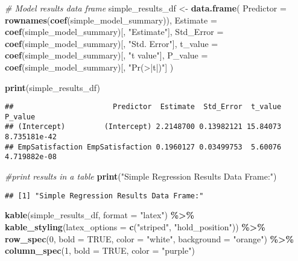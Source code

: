 \documentclass[
]{article}
\newenvironment{Shaded}{\begin{snugshade}}{\end{snugshade}}
\newcommand{\AttributeTok}[1]{\textcolor[rgb]{0.13,0.29,0.53}{#1}}
\newcommand{\CommentTok}[1]{\textcolor[rgb]{0.56,0.35,0.01}{\textit{#1}}}
\newcommand{\ConstantTok}[1]{\textcolor[rgb]{0.56,0.35,0.01}{#1}}
\newcommand{\DecValTok}[1]{\textcolor[rgb]{0.00,0.00,0.81}{#1}}
\newcommand{\FunctionTok}[1]{\textcolor[rgb]{0.13,0.29,0.53}{\textbf{#1}}}
\newcommand{\NormalTok}[1]{#1}
\newcommand{\OtherTok}[1]{\textcolor[rgb]{0.56,0.35,0.01}{#1}}
\newcommand{\SpecialCharTok}[1]{\textcolor[rgb]{0.81,0.36,0.00}{\textbf{#1}}}
\newcommand{\StringTok}[1]{\textcolor[rgb]{0.31,0.60,0.02}{#1}}
\begin{document}
\begin{Shaded}
\begin{Highlighting}[]
\CommentTok{\# Model results data frame}
\NormalTok{simple\_results\_df }\OtherTok{\textless{}{-}} \FunctionTok{data.frame}\NormalTok{(}
  \AttributeTok{Predictor =} \FunctionTok{rownames}\NormalTok{(}\FunctionTok{coef}\NormalTok{(simple\_model\_summary)),}
  \AttributeTok{Estimate =} \FunctionTok{coef}\NormalTok{(simple\_model\_summary)[, }\StringTok{"Estimate"}\NormalTok{],}
  \AttributeTok{Std\_Error =} \FunctionTok{coef}\NormalTok{(simple\_model\_summary)[, }\StringTok{"Std. Error"}\NormalTok{],}
  \AttributeTok{t\_value =} \FunctionTok{coef}\NormalTok{(simple\_model\_summary)[, }\StringTok{"t value"}\NormalTok{],}
  \AttributeTok{P\_value =} \FunctionTok{coef}\NormalTok{(simple\_model\_summary)[, }\StringTok{"Pr(\textgreater{}|t|)"}\NormalTok{]}
\NormalTok{)}

\FunctionTok{print}\NormalTok{(simple\_results\_df)}
\end{Highlighting}
\end{Shaded}

\begin{verbatim}
##                       Predictor  Estimate  Std_Error  t_value      P_value
## (Intercept)         (Intercept) 2.2148700 0.13982121 15.84073 8.735181e-42
## EmpSatisfaction EmpSatisfaction 0.1960127 0.03499753  5.60076 4.719882e-08
\end{verbatim}

\begin{Shaded}
\begin{Highlighting}[]
\CommentTok{\#print results in a table}
\FunctionTok{print}\NormalTok{(}\StringTok{"Simple Regression Results Data Frame:"}\NormalTok{)}
\end{Highlighting}
\end{Shaded}

\begin{verbatim}
## [1] "Simple Regression Results Data Frame:"
\end{verbatim}

\begin{Shaded}
\begin{Highlighting}[]
\FunctionTok{kable}\NormalTok{(simple\_results\_df, }\AttributeTok{format =} \StringTok{"latex"}\NormalTok{) }\SpecialCharTok{\%\textgreater{}\%}
  \FunctionTok{kable\_styling}\NormalTok{(}\AttributeTok{latex\_options =} \FunctionTok{c}\NormalTok{(}\StringTok{"striped"}\NormalTok{, }\StringTok{"hold\_position"}\NormalTok{)) }\SpecialCharTok{\%\textgreater{}\%}
  \FunctionTok{row\_spec}\NormalTok{(}\DecValTok{0}\NormalTok{, }\AttributeTok{bold =} \ConstantTok{TRUE}\NormalTok{, }\AttributeTok{color =} \StringTok{"white"}\NormalTok{, }\AttributeTok{background =} \StringTok{"orange"}\NormalTok{) }\SpecialCharTok{\%\textgreater{}\%}
  \FunctionTok{column\_spec}\NormalTok{(}\DecValTok{1}\NormalTok{, }\AttributeTok{bold =} \ConstantTok{TRUE}\NormalTok{, }\AttributeTok{color =} \StringTok{"purple"}\NormalTok{)}
\end{Highlighting}
\end{Shaded}
\end{document}
